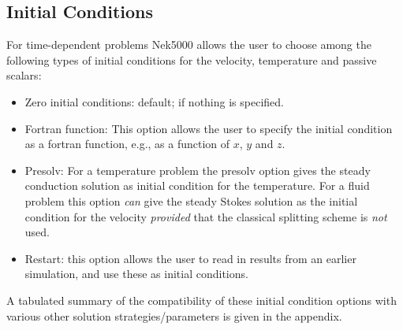 \subsection{Initial Conditions}

For time-dependent problems Nek5000 allows the user to choose among
the following types of initial conditions for the
velocity, temperature and passive scalars:
\begin{itemize}
\item Zero initial conditions: default; if nothing is specified.
\item Fortran function: This option allows the user to specify the
  initial condition as a fortran function,
  e.g., as a function of $x$, $y$ and $z$.
\item Presolv: For a temperature problem the presolv option gives the
  steady conduction solution as initial condition for the temperature.
  For a fluid problem this option {\em can} give the
  steady Stokes solution as the initial condition for the velocity
  {\em provided} that the classical splitting scheme is {\em not} used.
\item Restart: this option allows the user to read in results from an earlier
  simulation, and use these as initial conditions.
\end{itemize}
A tabulated summary of the compatibility of these initial condition options
with various other solution strategies/parameters is given in the appendix.
